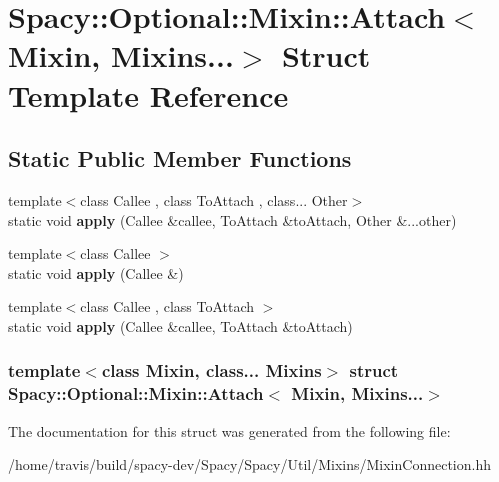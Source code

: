 \hypertarget{structSpacy_1_1Optional_1_1Mixin_1_1Attach_3_01Mixin_00_01Mixins_8_8_8_4}{\section{\-Spacy\-:\-:\-Optional\-:\-:\-Mixin\-:\-:\-Attach$<$ \-Mixin, \-Mixins...$>$ \-Struct \-Template \-Reference}
\label{structSpacy_1_1Optional_1_1Mixin_1_1Attach_3_01Mixin_00_01Mixins_8_8_8_4}
}
\subsection*{\-Static \-Public \-Member \-Functions}
\begin{DoxyCompactItemize}
\item 
\hypertarget{structSpacy_1_1Optional_1_1Mixin_1_1Attach_3_01Mixin_00_01Mixins_8_8_8_4_ad894bb9d5fba81bdc5ee4b92b2bd3ea2}{{\footnotesize template$<$class Callee , class To\-Attach , class... \-Other$>$ }\\static void {\bfseries apply} (\-Callee \&callee, \-To\-Attach \&to\-Attach, \-Other \&...other)}\label{structSpacy_1_1Optional_1_1Mixin_1_1Attach_3_01Mixin_00_01Mixins_8_8_8_4_ad894bb9d5fba81bdc5ee4b92b2bd3ea2}

\item 
\hypertarget{structSpacy_1_1Optional_1_1Mixin_1_1Attach_3_01Mixin_00_01Mixins_8_8_8_4_aeea135fae70063c50a7be0d29bbc46d5}{{\footnotesize template$<$class Callee $>$ }\\static void {\bfseries apply} (\-Callee \&)}\label{structSpacy_1_1Optional_1_1Mixin_1_1Attach_3_01Mixin_00_01Mixins_8_8_8_4_aeea135fae70063c50a7be0d29bbc46d5}

\item 
\hypertarget{structSpacy_1_1Optional_1_1Mixin_1_1Attach_3_01Mixin_00_01Mixins_8_8_8_4_a9986fd89deea15e2e3d55272bd4ff1f7}{{\footnotesize template$<$class Callee , class To\-Attach $>$ }\\static void {\bfseries apply} (\-Callee \&callee, \-To\-Attach \&to\-Attach)}\label{structSpacy_1_1Optional_1_1Mixin_1_1Attach_3_01Mixin_00_01Mixins_8_8_8_4_a9986fd89deea15e2e3d55272bd4ff1f7}

\end{DoxyCompactItemize}
\subsubsection*{template$<$class Mixin, class... \-Mixins$>$ struct Spacy\-::\-Optional\-::\-Mixin\-::\-Attach$<$ Mixin, Mixins...$>$}



\-The documentation for this struct was generated from the following file\-:\begin{DoxyCompactItemize}
\item 
/home/travis/build/spacy-\/dev/\-Spacy/\-Spacy/\-Util/\-Mixins/\-Mixin\-Connection.\-hh\end{DoxyCompactItemize}
